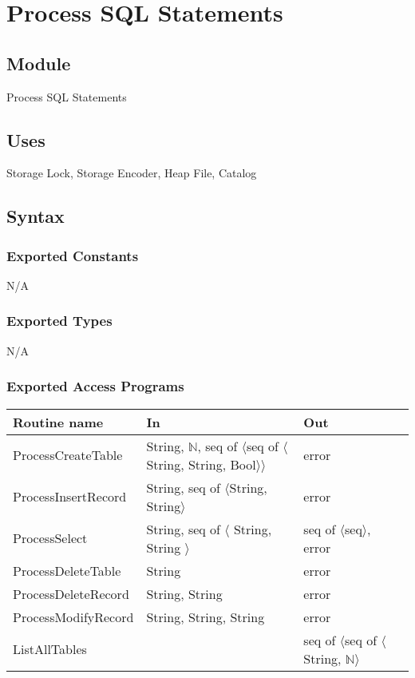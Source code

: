 \documentclass[12pt]{article}
\begin{document}
\newpage

\section {Process SQL Statements}

\subsection{Module}
Process SQL Statements

\subsection {Uses}
Storage Lock, Storage Encoder, Heap File, Catalog

\subsection {Syntax}

\subsubsection {Exported Constants}
N/A
\subsubsection {Exported Types}
N/A
\subsubsection {Exported Access Programs}

\begin{tabular}{| l | l | l | l |}
\hline
\textbf{Routine name} & \textbf{In} & \textbf{Out} \\
\hline
ProcessCreateTable & String, $\mathbb{N}$, seq of $\langle$seq of $\langle$String, String, Bool$\rangle \rangle$ & error \\
\hline
ProcessInsertRecord & String, seq of $\langle$String, String$\rangle$ & error \\
\hline
ProcessSelect & String, seq of $\langle$ String, String $\rangle$ & seq of $\langle$seq$\rangle$, error \\
\hline
ProcessDeleteTable & String & error \\
\hline
ProcessDeleteRecord & String, String & error \\
\hline
ProcessModifyRecord & String, String, String & error \\
\hline
ListAllTables &  & seq of $\langle$seq of $\langle$String, $\mathbb{N}\rangle$ \\
\hline
\end{tabular}
\end{document}
